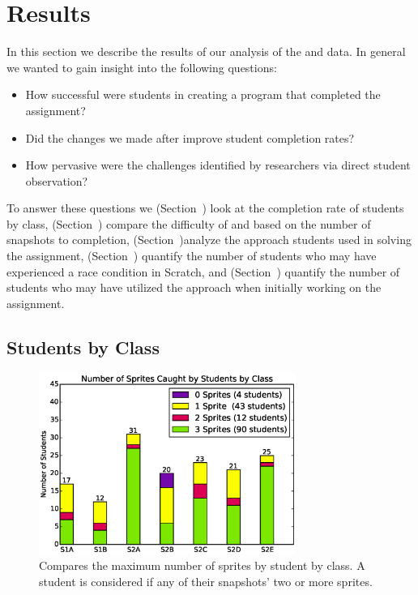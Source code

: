 \section{Results}
In this section we describe the results of our analysis of the \sone{} and
\stwo{} data. In general we wanted to gain insight into the following
questions:

\begin{itemize}
\item How successful were students in creating a program that completed the
  assignment?
\item Did the changes we made after \sone{} improve student completion rates?
\item How pervasive were the challenges identified by researchers via direct
  student observation?
\end{itemize}

To answer these questions we (Section~) look at the
completion rate of students by class, (Section~)
compare the difficulty of \sone{} and \stwo{} based on the number of snapshots
to completion, (Section~)analyze the approach students
used in solving the assignment, (Section~) quantify the
number of students who may have experienced a race condition in Scratch, and
(Section~) quantify the number of students who may have
utilized the \dce{} approach when initially working on the assignment.


\subsection{Students by Class}

\begin{figure}[!t]
\centering \includegraphics[width=3.3in]{graphs/by_class_students.eps}
\caption{Compares the maximum number of sprites \caught{} by student by
  class. A student is considered \com{} if any of their snapshots' 
  two or more sprites.}
\end{figure}

